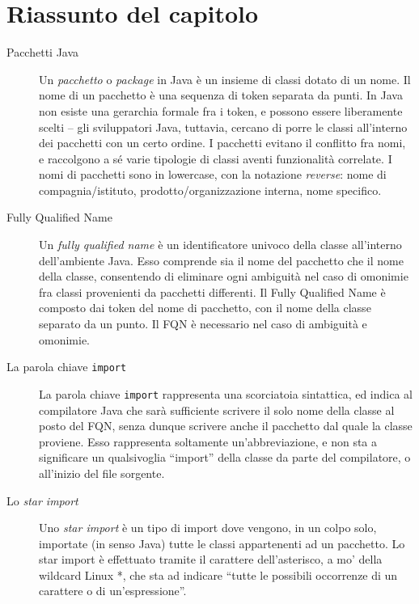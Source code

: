 \documentclass[\fontsizeclass,twocolumn]{\classname}
\theoremstyle{definition}
\theoremstyle{definition}
\begin{document}
\section{Riassunto del capitolo}

\begin{description}
    \item[Pacchetti Java] Un \emph{pacchetto} o \emph{package} in Java è un
        insieme di classi dotato di un nome. Il nome di un pacchetto è una
        sequenza di token separata da punti. In Java non esiste una gerarchia
        formale fra i token, e possono essere liberamente scelti \--- gli
        sviluppatori Java, tuttavia, cercano di porre le classi all'interno dei
        pacchetti con un certo ordine. I pacchetti evitano il conflitto fra
        nomi, e raccolgono a sé varie tipologie di classi aventi funzionalità
        correlate. I nomi di pacchetti sono in lowercase, con la notazione
        \emph{reverse}: nome di compagnia/istituto, prodotto/organizzazione
        interna, nome specifico.
    \item[Fully Qualified Name] Un \emph{fully qualified name} è un
        identificatore univoco della classe all'interno dell'ambiente Java.
        Esso comprende sia il nome del pacchetto che il nome della classe,
        consentendo di eliminare ogni ambiguità nel caso di omonimie fra classi
        provenienti da pacchetti differenti. Il Fully Qualified Name è composto
        dai token del nome di pacchetto, con il nome della classe separato da
        un punto. Il FQN è necessario nel caso di ambiguità e omonimie.
    \item[La parola chiave \texttt{import}] La parola chiave \texttt{import}
        rappresenta una scorciatoia sintattica, ed indica al compilatore Java
        che sarà sufficiente scrivere il solo nome della classe al posto del
        FQN, senza dunque scrivere anche il pacchetto dal quale la classe
        proviene. Esso rappresenta soltamente un'abbreviazione, e non sta a
        significare un qualsivoglia ``import'' della classe da parte del
        compilatore, o all'inizio del file sorgente.
    \item[Lo \emph{star import}] Uno \emph{star import} è un tipo di import
        dove vengono, in un colpo solo, importate (in senso Java) tutte le
        classi appartenenti ad un pacchetto. Lo star import è effettuato
        tramite il carattere dell'asterisco, a mo' della wildcard Linux *, che
        sta ad indicare ``tutte le possibili occorrenze di un carattere o di un'espressione''.

\end{description}
\end{document}
